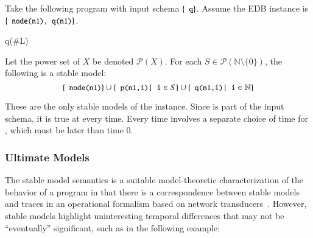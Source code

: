 \begin{example}
\label{ex:infinitemodels}
Take the following \lang program with input schema $\{\dedalus{q}\}$.  Assume the EDB instance is $\{\dedalus{node(n1), q(n1)}\}$.

\begin{Drules}
        {q(#L)}
\end{Drules}

Let the power set of $X$ be denoted $\mathcal{P}(X)$.  For each $S \in \mathcal{P}(\mathbb{N} \setminus \{0\})$, the following is a stable model:
$$\{\dedalus{node(n1)}\} \cup \{\dedalus{p(n1,i)} \, | \, \dedalus{i} \in S \} \cup \{{\dedalus{q(n1,i)} \, | \, \dedalus{i} \in \mathbb{N}}\}$$

These are the only stable models of the instance.  Since  is part of the input schema, it is true at every time.  Every time involves a separate choice of time for , which must be later than time 0.
\end{example}


\subsubsection{Ultimate Models}
The stable model semantics is a suitable model-theoretic characterization of the behavior of a program in that there is a correspondence between stable models and traces in an operational formalism based on network transducers~\cite{ameloot-operational}.  However, stable models highlight uninteresting temporal differences that may not be ``eventually'' significant, such as in the following example:

